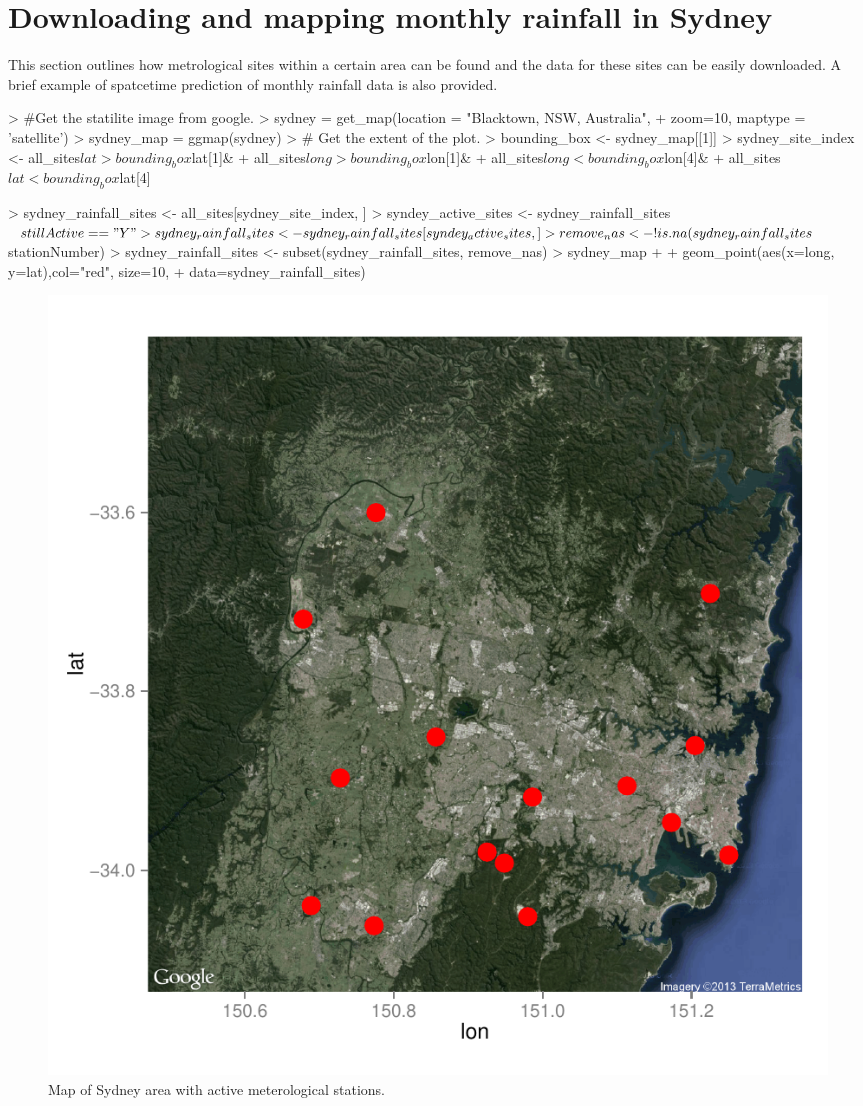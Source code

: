 \documentclass[12pt]{article}
\begin{document}
\newpage

\section{Downloading and mapping monthly rainfall in Sydney}
This section outlines how metrological sites within a certain area can be found and the data for these sites can be easily downloaded. A brief example of spatcetime prediction of monthly rainfall data is also provided. 

\begin{Schunk}
\begin{Sinput}
> #Get the statilite image from google.
> sydney = get_map(location = "Blacktown, NSW, Australia",
+                  zoom=10, maptype = 'satellite')
> sydney_map = ggmap(sydney)
> # Get the extent of the plot.
> bounding_box <- sydney_map[[1]]
> sydney_site_index <- all_sites$lat>bounding_box$lat[1]&
+   all_sites$long>bounding_box$lon[1]&
+   all_sites$long<bounding_box$lon[4]&
+   all_sites$lat<bounding_box$lat[4]
\end{Sinput}
\end{Schunk}
\begin{Schunk}
\begin{Sinput}
> sydney_rainfall_sites <- all_sites[sydney_site_index, ]
> syndey_active_sites <- sydney_rainfall_sites$stillActive =="Y"
> sydney_rainfall_sites <- sydney_rainfall_sites[syndey_active_sites,]
> remove_nas <- !is.na(sydney_rainfall_sites$stationNumber)
> sydney_rainfall_sites <- subset(sydney_rainfall_sites, remove_nas)
> sydney_map + 
+   geom_point(aes(x=long, y=lat),col="red", size=10, 
+              data=sydney_rainfall_sites)
\end{Sinput}
\end{Schunk}
\begin{figure}
\includegraphics{BOMdataRipper-overview-011}
\caption{Map of Sydney area with active meterological stations.}
\end{figure}
\end{document}
